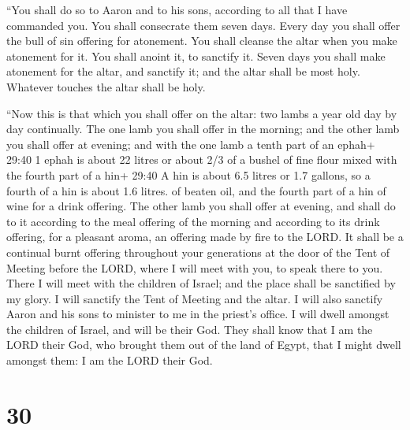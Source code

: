  ``You shall do so to Aaron and to his sons, according to
all that I have commanded you. You shall consecrate them seven days.
 Every day you shall offer the bull of sin offering for
atonement. You shall cleanse the altar when you make atonement for it.
You shall anoint it, to sanctify it.  Seven days you shall
make atonement for the altar, and sanctify it; and the altar shall be
most holy. Whatever touches the altar shall be holy.

 ``Now this is that which you shall offer on the altar: two
lambs a year old day by day continually.  The one lamb you
shall offer in the morning; and the other lamb you shall offer at
evening;  and with the one lamb a tenth part of an ephah+
29:40 1 ephah is about 22 litres or about 2/3 of a bushel of fine flour
mixed with the fourth part of a hin+ 29:40 A hin is about 6.5 litres or
1.7 gallons, so a fourth of a hin is about 1.6 litres. of beaten oil,
and the fourth part of a hin of wine for a drink offering. 
The other lamb you shall offer at evening, and shall do to it according
to the meal offering of the morning and according to its drink offering,
for a pleasant aroma, an offering made by fire to the LORD.
 It shall be a continual burnt offering throughout your
generations at the door of the Tent of Meeting before the LORD, where I
will meet with you, to speak there to you.  There I will
meet with the children of Israel; and the place shall be sanctified by
my glory.  I will sanctify the Tent of Meeting and the
altar. I will also sanctify Aaron and his sons to minister to me in the
priest's office.  I will dwell amongst the children of
Israel, and will be their God.  They shall know that I am
the LORD their God, who brought them out of the land of Egypt, that I
might dwell amongst them: I am the LORD their God.

\hypertarget{section-29}{%
\section{30}\label{section-29}}

